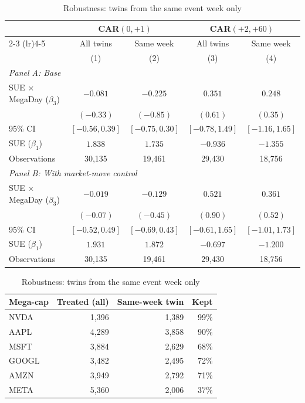 \begin{table}[htbp]
\centering
\small
\caption{Robustness: twins from the same event week only}
\label{tab:robust_sameweek}
\begin{tabular}{lcccc}
\toprule
 & \multicolumn{2}{c}{CAR$(0,+1)$} & \multicolumn{2}{c}{CAR$(+2,+60)$} \\
\cmidrule(lr){2-3} \cmidrule(lr){4-5}
 & All twins & Same week & All twins & Same week \\
 & (1) & (2) & (3) & (4) \\
\midrule
\multicolumn{5}{l}{\emph{Panel A: Base}} \\
SUE $\times$ MegaDay ($\beta_3$) & $-0.081$ & $-0.225$ & $0.351$ & $0.248$ \\
 & $(-0.33)$ & $(-0.85)$ & $(0.61)$ & $(0.35)$ \\
95\% CI & $[-0.56, 0.39]$ & $[-0.75, 0.30]$ & $[-0.78, 1.49]$ & $[-1.16, 1.65]$ \\
SUE ($\beta_1$) & $1.838$ & $1.735$ & $-0.936$ & $-1.355$ \\
Observations & 30,135 & 19,461 & 29,430 & 18,756 \\[2pt]
\midrule
\multicolumn{5}{l}{\emph{Panel B: With market-move control}} \\
SUE $\times$ MegaDay ($\beta_3$) & $-0.019$ & $-0.129$ & $0.521$ & $0.361$ \\
 & $(-0.07)$ & $(-0.45)$ & $(0.90)$ & $(0.52)$ \\
95\% CI & $[-0.52, 0.49]$ & $[-0.69, 0.43]$ & $[-0.61, 1.65]$ & $[-1.01, 1.73]$ \\
SUE ($\beta_1$) & $1.931$ & $1.872$ & $-0.697$ & $-1.200$ \\
Observations & 30,135 & 19,461 & 29,430 & 18,756 \\[2pt]
\bottomrule
\end{tabular}
\par\medskip
\begin{tabular}{lrrr}
\toprule
Mega-cap & Treated (all) & Same-week twin & Kept \\
\midrule
NVDA & 1,396 & 1,389 & 99\% \\
AAPL & 4,289 & 3,858 & 90\% \\
MSFT & 3,884 & 2,629 & 68\% \\
GOOGL & 3,482 & 2,495 & 72\% \\
AMZN & 3,949 & 2,792 & 71\% \\
META & 5,360 & 2,006 & 37\% \\

\end{tabular}
\end{table}
